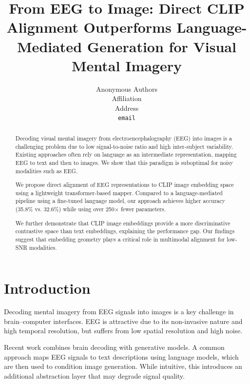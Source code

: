 \title{From EEG to Image: Direct CLIP Alignment Outperforms Language-Mediated Generation for Visual Mental Imagery}

\author{
Anonymous Authors\\
Affiliation\\
Address\\
\texttt{email}
}



\maketitle

\begin{abstract}
Decoding visual mental imagery from electroencephalography (EEG) into images is a challenging problem due to low signal-to-noise ratio and high inter-subject variability. Existing approaches often rely on language as an intermediate representation, mapping EEG to text and then to images. We show that this paradigm is suboptimal for noisy modalities such as EEG. 

We propose direct alignment of EEG representations to CLIP image embedding space using a lightweight transformer-based mapper. Compared to a language-mediated pipeline using a fine-tuned language model, our approach achieves higher accuracy (35.8\% vs. 32.6\%) while using over 250$\times$ fewer parameters. 

We further demonstrate that CLIP image embeddings provide a more discriminative contrastive space than text embeddings, explaining the performance gap. Our findings suggest that embedding geometry plays a critical role in multimodal alignment for low-SNR modalities.
\end{abstract}

\section{Introduction}

Decoding mental imagery from EEG signals into images is a key challenge in brain--computer interfaces. EEG is attractive due to its non-invasive nature and high temporal resolution, but suffers from low spatial resolution and high noise.

Recent work combines brain decoding with generative models. A common approach maps EEG signals to text descriptions using language models, which are then used to condition image generation. While intuitive, this introduces an additional abstraction layer that may degrade signal quality.

